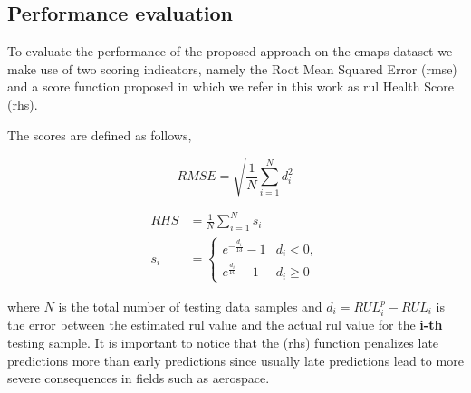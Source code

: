 \subsection{Performance evaluation}
\label{sec:rul_metrics}

To evaluate the performance of the proposed approach on the \gls{cmaps} dataset we make use of two scoring indicators, namely the Root Mean Squared Error (\gls{rmse}) and a score function proposed in \cite{Saxena2008} which we refer in this work as \gls{rul} Health Score (\gls{rhs}). 

\pagebreak

The scores are defined as follows,

\begin{equation}
RMSE = \sqrt{ \frac{1}{N} \sum_{i=1}^{N}{d_i^2}}
\label{eq:rmse}
\end{equation}

\begin{align}
RHS &= \frac{1}{N} \sum_{i=1}^{N}{s_i} \nonumber \\
s_i &= \begin{cases} 
      e^{-\frac{d_i}{13}} - 1 & d_i < 0, \\
      e^{\frac{d_i}{10}} - 1 & d_i \geq 0
\end{cases}
\label{eq:rhs}
\end{align}

where $N$ is the total number of testing data samples and $d_i = RUL_i^p - RUL_i$ is the error between the estimated \gls{rul} value and the actual \gls{rul} value for the \textbf{i-th} testing sample. It is important to notice that the (\gls{rhs}) function penalizes late predictions more than early predictions since usually late predictions lead to more severe consequences in fields such as aerospace.

